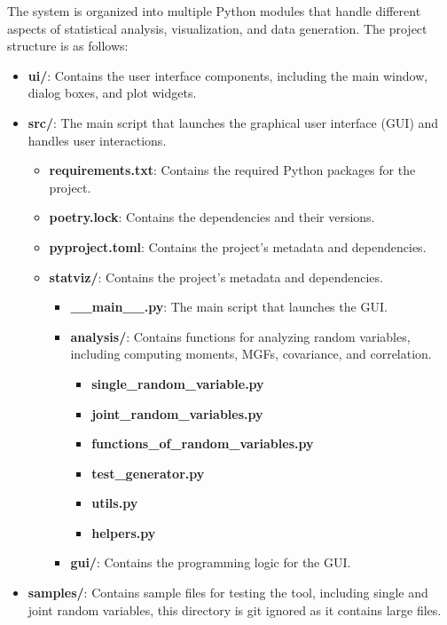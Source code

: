 \documentclass{article}
\begin{document}
The system is organized into multiple Python modules that handle different aspects of statistical analysis, visualization, and data generation. The project structure is as follows:

\begin{itemize}
    \item \textbf{ui/}: Contains the user interface components, including the main window, dialog boxes, and plot widgets.
    \item \textbf{src/}: The main script that launches the graphical user interface (GUI) and handles user interactions.
      \begin{itemize}
        \item \textbf{requirements.txt}: Contains the required Python packages for the project.
        \item \textbf{poetry.lock}: Contains the dependencies and their versions.
        \item \textbf{pyproject.toml}: Contains the project's metadata and dependencies.
        \item \textbf{statviz/}: Contains the project's metadata and dependencies.
          \begin{itemize}
            \item \textbf{\_\_main\_\_.py}: The main script that launches the GUI.
            \item \textbf{analysis/}: Contains functions for analyzing random variables, including computing moments, MGFs, covariance, and correlation.
                  \begin{itemize}
                    \item \textbf{single\_random\_variable.py}
                    \item \textbf{joint\_random\_variables.py}
                    \item \textbf{functions\_of\_random\_variables.py}
                    \item \textbf{test\_generator.py}
                    \item \textbf{utils.py}
                    \item \textbf{helpers.py}
                  \end{itemize}
            \item \textbf{gui/}: Contains the programming logic for the GUI.
          \end{itemize}
      \end{itemize}
    \item \textbf{samples/}: Contains sample files for testing the tool, including single and joint random variables, this directory is git ignored as it contains large files.
\end{itemize}
\end{document}
